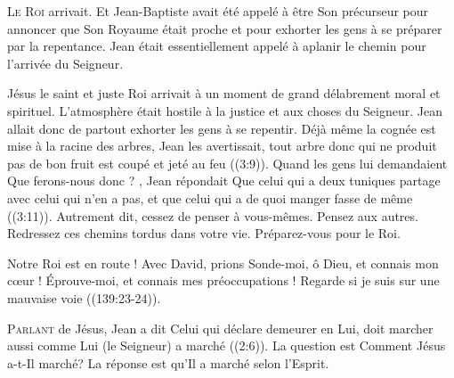 \lettrine{L}{e Roi} arrivait. Et Jean-Baptiste avait été appelé
 à être Son précurseur \ocadr pour annoncer que Son Royaume
 était proche et pour exhorter les gens à se préparer par la repentance.
 Jean était essentiellement appelé à aplanir le chemin
 pour l'arrivée du Seigneur.


Jésus \ocadr le saint et juste Roi \fcadr{} arrivait à un moment
 de grand délabrement moral et spirituel.
 L'atmosphère était hostile à la justice et aux choses du Seigneur.
 Jean allait donc de partout exhorter les gens à se repentir.
 \Og Déjà même la cognée est mise à la racine des arbres, Jean les avertissait,
 tout arbre donc qui ne produit pas de bon fruit est coupé et jeté au feu \Fg{}
 ((3:9)). 
 Quand les gens lui demandaient\frcolon{} 
 \Og Que ferons-nous donc ? \Fg{}, Jean répondait\frcolon{} 
 \Og Que celui qui a deux tuniques partage avec celui qui n'en a pas,
 et que celui qui a de quoi manger fasse de même \Fg{} ((3:11)).
 Autrement dit, cessez de penser à vous-mêmes. Pensez aux autres.
 Redressez ces chemins tordus dans votre vie. Préparez-vous pour le Roi.

Notre Roi est en route ! Avec David, prions\frcolon{} 
 \Og Sonde-moi, ô Dieu, et connais mon c\oe{}ur !
 Éprouve-moi, et connais mes préoccupations !
 Regarde si je suis sur une mauvaise voie \Fg{} ((139:23-24)).

\dvrule







\lettrine{P}{arlant} de Jésus, Jean a dit\frcolon{} 
 \Og Celui qui déclare demeurer en Lui, doit marcher aussi comme Lui
 (le Seigneur) a marché \Fg{} ((2:6)). 
 La question est\frcolon{}  \Og Comment Jésus a-t-Il marché? \Fg{}
 La réponse est qu'Il a marché selon l'Esprit. 

